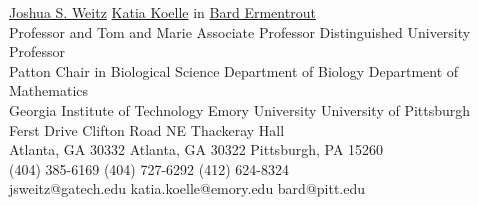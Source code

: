 \documentclass[a4paper,10pt]{article}
\begin{document}
        \begin{tabbing}
        \hskip 1in \= \href{http://weitzgroup.biosci.gatech.edu/}{Joshua S. Weitz}              \hskip 1.25in \= \href{https://scholarblogs.emory.edu/koellelab/}{Katia Koelle}      in \= \href{https://www.pitt.edu/~phase/}{Bard Ermentrout} \\    
        \>  Professor and Tom and Marie 										\> Associate Professor								\> Distinguished University Professor \\	
        \> Patton Chair in Biological Science	           										\> Department of Biology         			        				\> Department of Mathematics	\\
        \> Georgia Institute of Technology	            									\> Emory University	    					       			\> University of Pittsburgh \\
         Ferst Drive                												 Clifton Road NE				                 		 Thackeray Hall \\
        \> Atlanta, GA 30332														\> Atlanta, GA 30322		                     					\> Pittsburgh, PA  15260  \\
        \> (404) 385-6169														\> (404) 727-6292        			                 			\> (412) 624-8324   \\   
        \> jsweitz@gatech.edu													\> katia.koelle@emory.edu                       	    				\> bard@pitt.edu   \\
        \end{tabbing}
        
        
\end{document}
